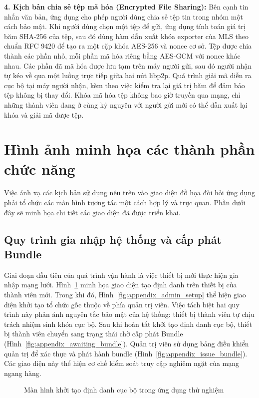 \documentclass[../DoAn.tex]{subfiles}
\begin{document}
\textbf{4. Kịch bản chia sẻ tệp mã hóa (Encrypted File Sharing):}
Bên cạnh tin nhắn văn bản, ứng dụng cho phép người dùng chia sẻ tệp tin trong nhóm một cách bảo mật. Khi người dùng chọn một tệp để gửi, ứng dụng tính toán giá trị băm SHA-256 của tệp, sau đó dùng hàm dẫn xuất khóa exporter của MLS theo chuẩn RFC 9420 để tạo ra một cặp khóa AES-256 và nonce cơ sở. Tệp được chia thành các phần nhỏ, mỗi phần mã hóa riêng bằng AES-GCM với nonce khác nhau. Các phần đã mã hóa được lưu tạm trên máy người gửi, sau đó người nhận tự kéo về qua một luồng trực tiếp giữa hai nút libp2p. Quá trình giải mã diễn ra cục bộ tại máy người nhận, kèm theo việc kiểm tra lại giá trị băm để đảm bảo tệp không bị thay đổi. Khóa mã hóa tệp không bao giờ truyền qua mạng, chỉ những thành viên đang ở cùng kỷ nguyên với người gửi mới có thể dẫn xuất lại khóa và giải mã được tệp.

\section{Hình ảnh minh họa các thành phần chức năng}

Việc ánh xạ các kịch bản sử dụng nêu trên vào giao diện đồ họa đòi hỏi ứng dụng phải tổ chức các màn hình tương tác một cách hợp lý và trực quan. Phần dưới đây sẽ minh họa chi tiết các giao diện đã được triển khai.

\subsection{Quy trình gia nhập hệ thống và cấp phát Bundle}

Giai đoạn đầu tiên của quá trình vận hành là việc thiết bị mới thực hiện gia nhập mạng lưới. Hình~\ref{fig:appendix_welcome} minh họa giao diện tạo định danh trên thiết bị của thành viên mới. Trong khi đó, Hình~\ref{fig:appendix_admin_setup} thể hiện giao diện khởi tạo tổ chức gốc thuộc về phía quản trị viên. Việc tách biệt hai quy trình này phản ánh nguyên tắc bảo mật của hệ thống: thiết bị thành viên tự chịu trách nhiệm sinh khóa cục bộ. Sau khi hoàn tất khởi tạo định danh cục bộ, thiết bị thành viên chuyển sang trạng thái chờ cấp phát Bundle (Hình~\ref{fig:appendix_awaiting_bundle}). Quản trị viên sử dụng bảng điều khiển quản trị để xác thực và phát hành bundle (Hình~\ref{fig:appendix_issue_bundle}). Các giao diện này thể hiện cơ chế kiểm soát truy cập nghiêm ngặt của mạng ngang hàng.

\begin{figure}[htbp]
\centering
{}
\caption{Màn hình khởi tạo định danh cục bộ trong ứng dụng thử nghiệm}
\label{fig:appendix_welcome}
\end{figure}
\end{document}
